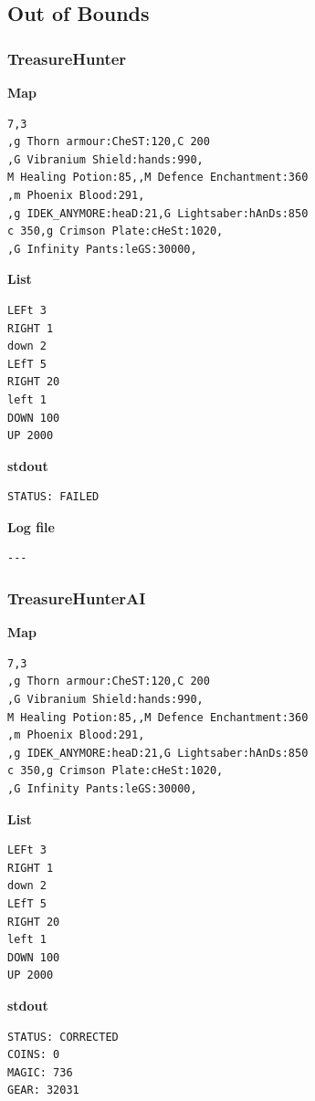 \documentclass{article}
\begin{document}
\subsection{Out of Bounds}
\subsubsection{TreasureHunter}
\quad \textbf{Map}
\begin{lstlisting}
7,3
,g Thorn armour:CheST:120,C 200
,G Vibranium Shield:hands:990,
M Healing Potion:85,,M Defence Enchantment:360
,m Phoenix Blood:291,
,g IDEK_ANYMORE:heaD:21,G Lightsaber:hAnDs:850
c 350,g Crimson Plate:cHeSt:1020,
,G Infinity Pants:leGS:30000,
\end{lstlisting}

\textbf{List}
\begin{lstlisting}
LEFt 3
RIGHT 1
down 2
LEfT 5
RIGHT 20
left 1
DOWN 100
UP 2000
\end{lstlisting}
\pagebreak

\textbf{stdout}
\begin{lstlisting}
STATUS: FAILED
\end{lstlisting}

\textbf{Log file}
\begin{lstlisting}
---
\end{lstlisting}

\subsubsection{TreasureHunterAI}
\quad \textbf{Map}
\begin{lstlisting}
7,3
,g Thorn armour:CheST:120,C 200
,G Vibranium Shield:hands:990,
M Healing Potion:85,,M Defence Enchantment:360
,m Phoenix Blood:291,
,g IDEK_ANYMORE:heaD:21,G Lightsaber:hAnDs:850
c 350,g Crimson Plate:cHeSt:1020,
,G Infinity Pants:leGS:30000,
\end{lstlisting}

\textbf{List}
\begin{lstlisting}
LEFt 3
RIGHT 1
down 2
LEfT 5
RIGHT 20
left 1
DOWN 100
UP 2000
\end{lstlisting}
\pagebreak

\textbf{stdout}
\begin{lstlisting}
STATUS: CORRECTED
COINS: 0
MAGIC: 736
GEAR: 32031
\end{lstlisting}
\end{document}
